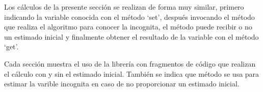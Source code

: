 	Los cálculos de la presente sección se realizan de forma muy similar, primero indicando la variable conocida con el método `set', después invocando el método que realiza el algoritmo para conocer la incognita, el método puede recibir o no un estimado inicial y finalmente obtener el resultado de la variable con el método `get'.

	Cada sección muestra el uso de la librería con fragmentos de código que realizan el cálculo con y sin el estimado inicial. También se indica que método se usa para estimar la varible incognita en caso de no proporcionar un estimado inicial.

		
